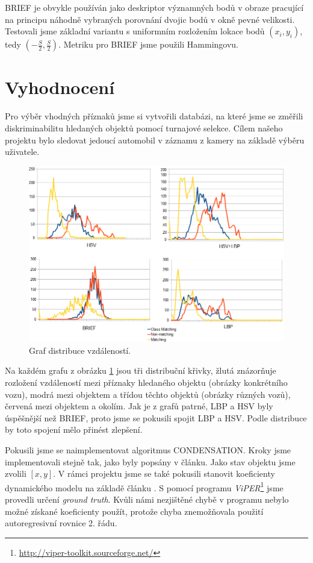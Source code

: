 \documentclass[12pt]{article}
\begin{document}
BRIEF\cite{brief} je obvykle používán jako deskriptor významných bodů v obraze pracující na principu náhodně vybraných porovnání dvojic bodů v okně pevné velikosti. Testovali jsme základní variantu s uniformním rozložením lokace bodů $(x_i, y_i)$, tedy $(-\frac{S}{2}, \frac{S}{2})$. Metriku pro BRIEF jsme použili Hammingovu.




\section{Vyhodnocení}

Pro výběr vhodných příznaků jsme si vytvořili databázi, na které jsme se změřili diskriminabilitu hledaných objektů pomocí turnajové selekce. Cílem našeho projektu bylo sledovat jedoucí automobil v záznamu z kamery na základě výběru uživatele.

\begin{figure}[htb]
  \centering
  \includegraphics[scale=0.60]{all.png}
  \caption{Graf distribuce vzdáleností.}
  \label{graph}
\end{figure}
Na každém grafu z obrázku \ref{graph} jsou tři distribuční křivky, žlutá znázorňuje rozložení vzdáleností mezi příznaky hledaného objektu (obrázky konkrétního vozu), modrá mezi objektem a třídou těchto objektů (obrázky různých vozů), červená mezi objektem a okolím. Jak je z grafů patrné, LBP a HSV byly úspěšnější než BRIEF, proto jsme se pokusili spojit LBP a HSV. Podle distribuce by toto spojení mělo přinést zlepšení.

Pokusili jsme se naimplementovat algoritmus CONDENSATION. Kroky jsme implementovali stejně tak, jako byly popsány v článku. Jako stav objektu jsme zvolili $\left[x,y\right]$. V rámci projektu jsme se také pokusili stanovit koeficienty dynamického modelu na základě článku \cite{blake95}. S pomocí programu \textit{ViPER}\footnote{\url{http://viper-toolkit.sourceforge.net/}} jsme provedli určení \textit{ground truth}. Kvůli námi nezjištěné chybě v programu nebylo možné získané koeficienty použít, protože chyba znemožňovala použití autoregresivní rovnice 2. řádu.
\end{document}
